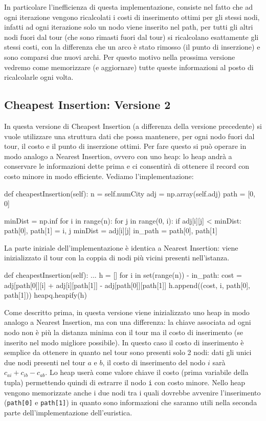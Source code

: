 \documentclass[a4paper,12pt]{report}
\begin{document}
In particolare l'inefficienza di questa implementazione, consiste nel fatto che ad ogni iterazione vengono ricalcolati i costi di inserimento ottimi per gli stessi nodi, infatti ad ogni iterazione solo un nodo viene inserito nel path, per tutti gli altri nodi fuori dal tour (che sono rimasti fuori dal tour) si ricalcolano esattamente gli stessi costi, con la differenza che un arco è stato rimosso (il punto di inserzione) e sono comparsi due nuovi archi. Per questo motivo nella prossima versione vedremo come memorizzare (e aggiornare) tutte queste informazioni al posto di ricalcolarle ogni volta.

\subsection{Cheapest Insertion: Versione 2}
In questa versione di Cheapest Insertion (a differenza della versione precedente) si vuole utilizzare una struttura dati che possa mantenere, per ogni nodo fuori dal tour, il costo e il punto di inserzione ottimi. Per fare questo si può operare in modo analogo a Nearest Insertion, ovvero con uno heap: lo heap andrà a conservare le informazioni dette prima e ci consentirà di ottenere il record con costo minore in modo efficiente. Vediamo l'implementazione:
\begin{python}
def cheapestInsertion(self):
  n = self.numCity
  adj = np.array(self.adj)
  path = [0, 0]

  minDist = np.inf
  for i in range(n):
      for j in range(0, i):
          if adj[i][j] < minDist:
              path[0], path[1] = i, j
              minDist = adj[i][j]
  in_path = {path[0], path[1]}
\end{python}
La parte iniziale dell'implementazione è identica a Nearest Insertion: viene inizializzato il tour con la coppia di nodi più vicini presenti nell'istanza.
\begin{python}
def cheapestInsertion(self):
  ...
  h = []
  for i in set(range(n)) - in_path:
    cost = adj[path[0]][i] + adj[i][path[1]] - adj[path[0]][path[1]]
    h.append((cost, i, path[0], path[1]))
  heapq.heapify(h)
\end{python}
Come descritto prima, in questa versione viene inizializzato uno heap in modo analogo a Nearest Insertion, ma con una differenza: la chiave associata ad ogni nodo non è più la distanza minima con il tour ma il costo di inserimento (se inserito nel modo migliore possibile). In questo caso il costo di inserimento è semplice da ottenere in quanto nel tour sono presenti solo 2 nodi: dati gli unici due nodi presenti nel tour $a$ e $b$, il costo di inserimento del nodo $i$ sarà $c_{ai} + c_{ib} - c_{ab}$. Lo heap userà come valore chiave il costo (prima variabile della tupla) permettendo quindi di estrarre il nodo \lstinline!i! con costo minore. Nello heap vengono memorizzate anche i due nodi tra i quali dovrebbe avvenire l'inserimento (\lstinline!path[0]! e \lstinline!path[1]!) in quanto sono informazioni che saranno utili nella seconda parte dell'implementazione dell'euristica.
\end{document}
